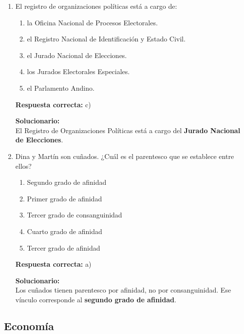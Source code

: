 \begin{enumerate}
	
	
	\item El registro de organizaciones políticas está a cargo de:
	\begin{enumerate}[label=\alph*)]
		\item la Oficina Nacional de Procesos Electorales.
		\item el Registro Nacional de Identificación y Estado Civil.
		\item el Jurado Nacional de Elecciones.
		\item los Jurados Electorales Especiales.
		\item el Parlamento Andino.
	\end{enumerate}
	\textbf{Respuesta correcta:} c)
	
	\vspace{2mm}
	\textbf{Solucionario:}\\
	El Registro de Organizaciones Políticas está a cargo del \textbf{Jurado Nacional de Elecciones}.
	
	\vspace{6mm}
	
	\item Dina y Martín son cuñados. ¿Cuál es el parentesco que se establece entre ellos?
	\begin{enumerate}[label=\alph*)]
		\item Segundo grado de afinidad
		\item Primer grado de afinidad
		\item Tercer grado de consanguinidad
		\item Cuarto grado de afinidad
		\item Tercer grado de afinidad
	\end{enumerate}
	\textbf{Respuesta correcta:} a)
	
	\vspace{2mm}
	\textbf{Solucionario:}\\
	Los cuñados tienen parentesco por afinidad, no por consanguinidad.  
	Ese vínculo corresponde al \textbf{segundo grado de afinidad}.
	
	\vspace{6mm}
	
\end{enumerate}

\subsection*{Economía}

